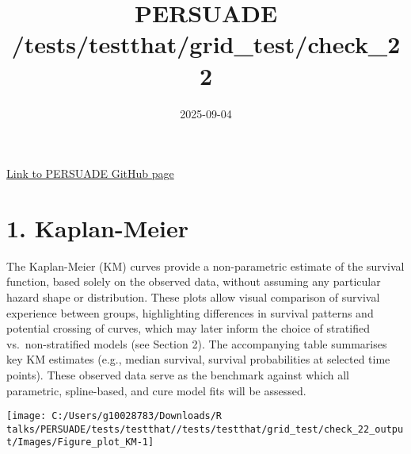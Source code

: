 \documentclass[
]{article}
\title{PERSUADE /tests/testthat/grid\_test/check\_22}
\author{}
\date{\vspace{-2.5em}2025-09-04}
\begin{document}
\maketitle

{
\hypersetup{linkcolor=}
\setcounter{tocdepth}{2}
\tableofcontents
}
\hfill\break

\href{https://github.com/Bram-R/PERSUADE}{Link to PERSUADE GitHub page}

\clearpage

\section{1. Kaplan-Meier}\label{kaplan-meier}

The Kaplan-Meier (KM) curves provide a non-parametric estimate of the
survival function, based solely on the observed data, without assuming
any particular hazard shape or distribution. These plots allow visual
comparison of survival experience between groups, highlighting
differences in survival patterns and potential crossing of curves, which
may later inform the choice of stratified vs.~non-stratified models (see
Section 2). The accompanying table summarises key KM estimates (e.g.,
median survival, survival probabilities at selected time points). These
observed data serve as the benchmark against which all parametric,
spline-based, and cure model fits will be assessed.

\clearpage

\begin{flushleft}\texttt{[image: C:/Users/g10028783/Downloads/R talks/PERSUADE/tests/testthat//tests/testthat/grid\_test/check\_22\_output/Images/Figure\_plot\_KM-1]} \end{flushleft}

\begin{table}[H]
\centering
\caption{\label{tab:Table_1}Observed survival data}
\centering
{}
\end{table}
\end{document}
